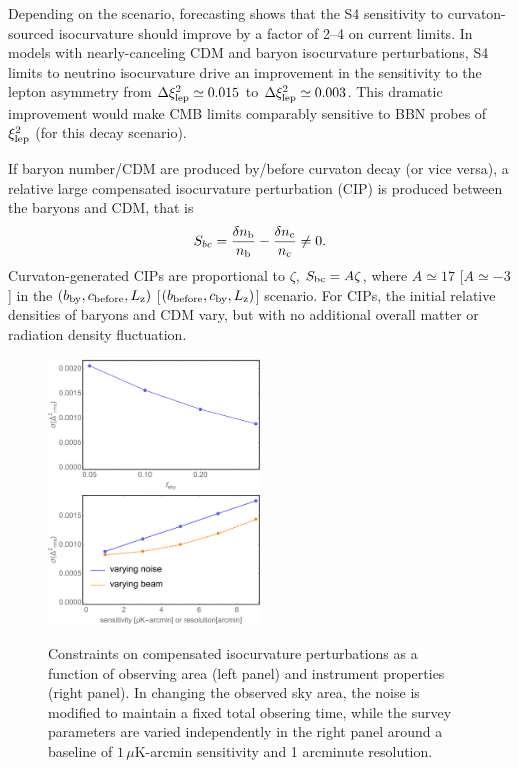 Depending on the scenario, forecasting shows that the S4 sensitivity to curvaton-sourced isocurvature should improve by a factor of 2--4 on current limits. In models with nearly-canceling CDM and baryon isocurvature perturbations, S4 limits to neutrino isocurvature drive an improvement in the sensitivity to the lepton asymmetry from $\Delta \xi_{\rm lep}^{2}\simeq 0.015$ to $\Delta \xi_{\rm lep}^{2}\simeq 0.003$. This dramatic improvement would make CMB limits comparably sensitive to BBN probes of $\xi_{\rm lep}^{2}$ (for this decay scenario).

If baryon number/CDM are produced by/before curvaton decay (or vice versa), a relative large compensated isocurvature perturbation (CIP) is produced between the baryons and CDM, that is
\begin{equation}
S_{bc}=\frac{\delta n_{\rm b}}{n_{\rm b}}-\frac{\delta n_{\rm c}}{n_{\rm c}}\neq 0.
\end{equation} Curvaton-generated CIPs are proportional to $\zeta$, $S_{\rm bc}=A\zeta$, where $A\simeq 17$ [$A\simeq -3$] in the $(b_{\rm by}, c_{\rm before}, L_{\rm z})$ [$(b_{\rm before}, c_{\rm by}, L_{\rm z})$] scenario. For CIPs, the initial relative densities of baryons and CDM vary, but with no additional overall matter or radiation density fluctuation.

\begin{figure}[htbp!]
\includegraphics[width=0.5\textwidth]{Inflation/S4CIPsfsky.pdf}
 \includegraphics[width=0.5\textwidth]{Inflation/S4CIPsNoise.pdf}
 \caption{Constraints on compensated isocurvature perturbations as a function of observing area (left panel) and instrument properties (right panel). In changing the observed sky area, the noise is modified to maintain a fixed total obsering time, while the survey parameters are varied independently in the right panel around a baseline of $1\,\mu$K-arcmin sensitivity and 1 arcminute resolution.
\label{fig:CIPs_kovetz}}
\end{figure} 

